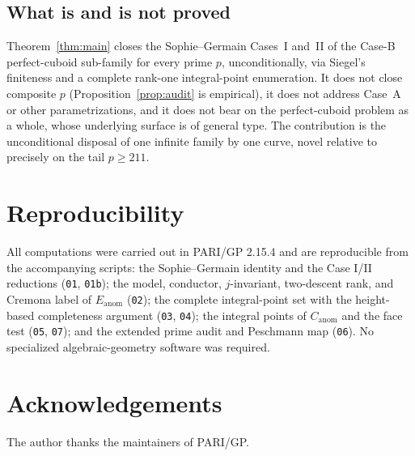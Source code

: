 \documentclass[11pt,reqno]{amsart}
\theoremstyle{plain}
\theoremstyle{definition}
\newcommand{\Eanom}{E_{\mathrm{anom}}}
\newcommand{\Canom}{C_{\mathrm{anom}}}
\begin{document}
\subsection{What is and is not proved}
Theorem~\ref{thm:main} closes the Sophie--Germain Cases~I and~II of the Case-B
perfect-cuboid sub-family for every prime $p$, unconditionally, via Siegel's finiteness
and a complete rank-one integral-point enumeration. It does not close composite $p$
(Proposition~\ref{prop:audit} is empirical), it does not address Case~A or other
parametrizations, and it does not bear on the perfect-cuboid problem as a whole, whose
underlying surface is of general type. The contribution is the unconditional disposal of
one infinite family by one curve, novel relative to \cite{Pes1} precisely on the tail
$p\ge 211$.

\section*{Reproducibility}
All computations were carried out in PARI/GP 2.15.4 and are reproducible from the
accompanying scripts: the Sophie--Germain identity and the Case I/II reductions
(\texttt{01}, \texttt{01b}); the model, conductor, $j$-invariant, two-descent rank, and
Cremona label of $\Eanom$ (\texttt{02}); the complete integral-point set with the
height-based completeness argument (\texttt{03}, \texttt{04}); the integral points of
$\Canom$ and the face test (\texttt{05}, \texttt{07}); and the extended prime audit and
Peschmann map (\texttt{06}). No specialized algebraic-geometry software was required.

\section*{Acknowledgements}
The author thanks the maintainers of PARI/GP.
\end{document}
